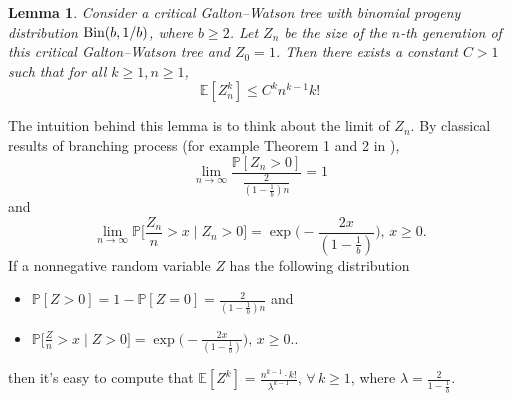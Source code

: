 \documentclass[12pt]{article}
\newtheorem{lemma}[theorem]{Lemma}
\numberwithin{equation}{section}
\newcommand{\1}{\mathbf{1}}
\begin{document}
\begin{lemma}\label{lem: upper bound on the k-th moment of Z_n for a critical GW tree}
	Consider a critical Galton--Watson tree with binomial progeny distribution   $\textnormal{Bin}(b,1/b)$, where $b\geq2$. Let $Z_n$ be the size of the $n$-th generation of this critical Galton--Watson tree and $Z_0=1$.  Then there exists a constant $C>1$ such that for all $k\geq 1,n\geq 1$,
	\[
	\mathbb{E}[Z_n^k]\leq C^k n^{k-1} k!
	\]
\end{lemma}
The intuition behind this lemma is to think about the limit of $Z_n$. By classical results of branching process (for example Theorem 1 and 2 in \cite[page 19-20]{AthreyaNey1972}),  
\[
\lim_{n\rightarrow\infty}\frac{\mathbb{P}[Z_n>0]}{\frac{2}{(1-\frac{1}{b})n}}=1
\]
and 
\[
\lim_{n\rightarrow\infty}\mathbb{P}\bigg[\frac{Z_n}{n}>x\mid Z_n>0\bigg]=\exp\big(-\frac{2x}{(1-\frac{1}{b})}\big),\,x\geq 0.
\]
If a nonnegative random variable $Z$ has the following distribution
\begin{itemize}
	\item $\mathbb{P}[Z>0]=1-\mathbb{P}[Z=0]=\frac{2}{(1-\frac{1}{b})n}$ and
	\item $\mathbb{P}\bigg[\frac{Z}{n}>x\mid Z>0\bigg]=\exp\big(-\frac{2x}{(1-\frac{1}{b})}\big),\,x\geq 0.$.
\end{itemize}
then it's easy to compute that $\mathbb{E}[Z^k]= \frac{n^{k-1}\cdot k!}{\lambda^{k-1}},\,\forall\, k\geq 1$, where $\lambda=\frac{2}{1-\frac{1}{b}}$.
\end{document}
